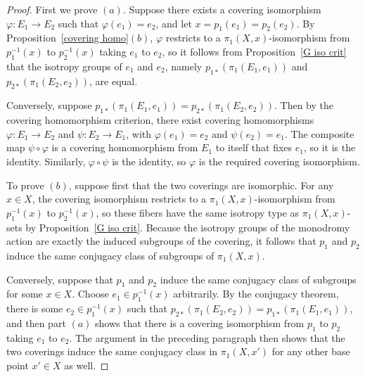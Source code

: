 \begin{proof}
First we prove $(a)$. Suppose there exists a covering isomorphism $\varphi:E_1\to E_2$ such that $\varphi(e_1)=e_2$, and let $x=p_1(e_1)=p_2(e_2)$. By Proposition~\ref{covering homo}$(b)$, $\varphi$ restricts to a $\pi_1(X,x)$-isomorphism from $p_1^{-1}(x)$ to $p_2^{-1}(x)$ taking $e_1$ to $e_2$, so it follows from Proposition~\ref{G iso crit} that the isotropy groups of $e_1$ and $e_2$, namely $p_{1*}(\pi_1(E_1,e_1))$ and $p_{2*}(\pi_1(E_2,e_2))$, are equal.\par
Conversely, suppose $p_{1*}(\pi_1(E_1,e_1))=p_{2*}(\pi_1(E_2,e_2))$. Then by the covering homomorphism criterion, there exist covering homomorphisms $\varphi:E_1\to E_2$ and $\psi:E_2\to E_1$, with $\varphi(e_1)=e_2$ and $\psi(e_2)=e_1$. The composite map $\psi\circ\varphi$ is a covering homomorphism from $E_1$ to itself that fixes $e_1$, so it is the identity. Similarly, $\varphi\circ\psi$ is the identity, so $\varphi$ is the required covering isomorphism.\par
To prove $(b)$, suppose first that the two coverings are isomorphic. For any $x\in X$, the covering isomorphism restricts to a $\pi_1(X,x)$-isomorphism from $p_1^{-1}(x)$ to $p_2^{-1}(x)$, so these fibers have the same isotropy type as $\pi_1(X,x)$-sets by Proposition~\ref{G iso crit}. Because the isotropy groups of the monodromy action are exactly the induced subgroups of the covering, it follows that $p_1$ and $p_2$ induce the same conjugacy class of subgroups of $\pi_1(X,x)$.\par
Conversely, suppose that $p_1$ and $p_2$ induce the same conjugacy class of subgroups
for some $x\in X$. Choose $e_1\in p_1^{-1}(x)$ arbitrarily. By the conjugacy theorem, there is some $e_2\in p_1^{-1}(x)$ such that $p_{2*}(\pi_1(E_2,e_2))=p_{1*}(\pi_1(E_1,e_1))$, and then part $(a)$ shows that there is a covering isomorphism from $p_1$ to $p_2$ taking $e_1$ to $e_2$. The argument in the preceding paragraph then shows that the two coverings induce the same conjugacy class in $\pi_1(X,x')$ for any other base point $x'\in X$ as well.
\end{proof}
\vspace{5mm}
